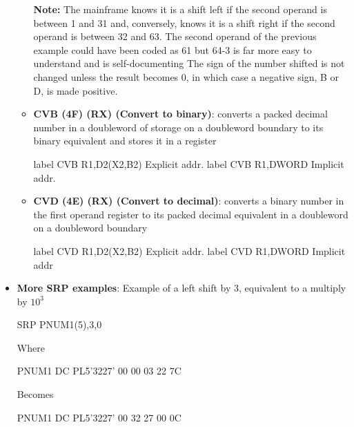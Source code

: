 \documentclass{report}
\begin{document}
\begin{itemize}
\begin{itemize}
                    \bigbreak \noindent 
                    \textbf{Note:} The mainframe knows it is a shift left if the second operand is between 1 and 31 and, conversely, knows it is a shift right if the second operand is between 32 and 63.
                    \bigbreak \noindent 
                    The second operand of the previous example could have been coded as 61 but 64-3 is far more easy to understand and is self-documenting
                    \bigbreak \noindent 
                    The sign of the number shifted is not changed unless the result becomes 0, in which case a negative sign, B or D, is made positive.
                \item \textbf{CVB (4F) (RX) (Convert to binary)}: converts a packed decimal number in a doubleword of storage on a doubleword boundary to its binary equivalent and stores it in a register
                    \bigbreak \noindent 
                    \begin{cppcode}
                        label CVB R1,D2(X2,B2) Explicit addr.
                        label CVB R1,DWORD Implicit addr.
                    \end{cppcode}
                \item \textbf{CVD (4E) (RX) (Convert to decimal)}: converts a binary number in the first operand register to its packed decimal equivalent in a doubleword on a doubleword boundary
                    \bigbreak \noindent 
                    \begin{cppcode}
                        label CVD R1,D2(X2,B2) Explicit addr.
                        label CVD R1,DWORD Implicit addr
                    \end{cppcode}
            \end{itemize}
        \item \textbf{More SRP examples}: Example of a left shift by 3, equivalent to a multiply by $10^{3}$
            \bigbreak \noindent 
            \begin{cppcode}
            SRP PNUM1(5),3,0
            \end{cppcode}
            \bigbreak \noindent 
            Where 
            \bigbreak \noindent 
            \begin{cppcode}
            PNUM1 DC PL5'3227'     00 00 03 22 7C
            \end{cppcode}
            \bigbreak \noindent 
            Becomes
            \bigbreak \noindent 
            \begin{cppcode}
            PNUM1 DC PL5'3227'     00 32 27 00 0C

\end{cppcode}
\end{itemize}
\end{document}
